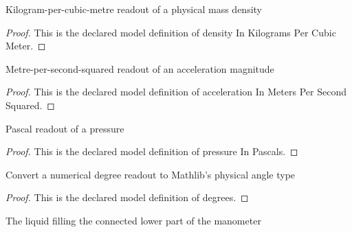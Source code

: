 \begin{definition}
  \label{def:physics:phyx-mini-0387:phyxminiproblems-problemphyxmini0387-densityinkilogramspercubicmeter}
  Kilogram-per-cubic-metre readout of a physical mass density
\end{definition}
\begin{proof}
  This is the declared model definition of density In Kilograms Per Cubic Meter.
\end{proof}
\begin{definition}
  \label{def:physics:phyx-mini-0387:phyxminiproblems-problemphyxmini0387-accelerationinmeterspersecondsquared}
  Metre-per-second-squared readout of an acceleration magnitude
\end{definition}
\begin{proof}
  This is the declared model definition of acceleration In Meters Per Second Squared.
\end{proof}
\begin{definition}
  \label{def:physics:phyx-mini-0387:phyxminiproblems-problemphyxmini0387-pressureinpascals}
  Pascal readout of a pressure
\end{definition}
\begin{proof}
  This is the declared model definition of pressure In Pascals.
\end{proof}
\begin{definition}[degrees]
  \label{def:physics:phyx-mini-0387:phyxminiproblems-problemphyxmini0387-degrees}
  Convert a numerical degree readout to Mathlib's physical angle type
\end{definition}
\begin{proof}
  This is the declared model definition of degrees.
\end{proof}
\begin{definition}
  \label{def:physics:phyx-mini-0387:phyxminiproblems-problemphyxmini0387-manometerliquid}
  The liquid filling the connected lower part of the manometer
\end{definition}
